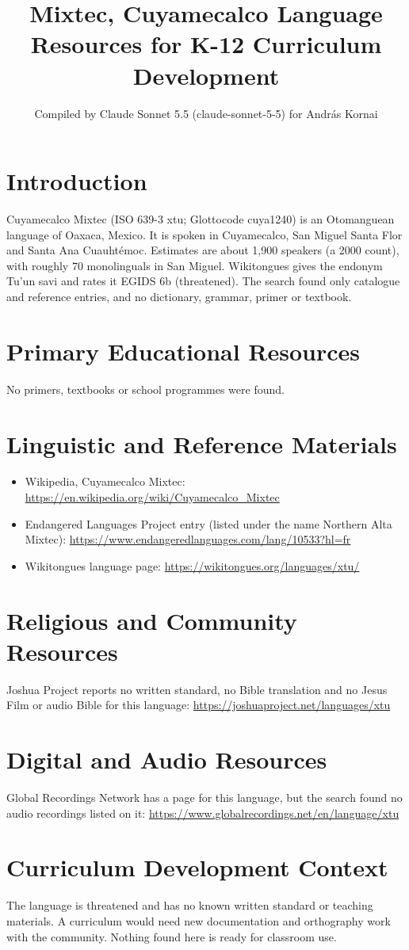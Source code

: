 \documentclass[12pt]{article}
\title{Mixtec, Cuyamecalco Language Resources for K-12 Curriculum Development}
\author{Compiled by Claude Sonnet 5.5 (claude-sonnet-5-5) for Andr\'as Kornai}
\date{}
\begin{document}
\maketitle

\section{Introduction}
Cuyamecalco Mixtec (ISO 639-3 xtu; Glottocode cuya1240) is an Otomanguean language of Oaxaca, Mexico. It is spoken in Cuyamecalco, San Miguel Santa Flor and Santa Ana Cuauhtémoc. Estimates are about 1,900 speakers (a 2000 count), with roughly 70 monolinguals in San Miguel. Wikitongues gives the endonym Tu'un savi and rates it EGIDS 6b (threatened). The search found only catalogue and reference entries, and no dictionary, grammar, primer or textbook.

\section{Primary Educational Resources}
No primers, textbooks or school programmes were found.

\section{Linguistic and Reference Materials}
\begin{itemize}
\item Wikipedia, Cuyamecalco Mixtec: \url{https://en.wikipedia.org/wiki/Cuyamecalco_Mixtec}
\item Endangered Languages Project entry (listed under the name Northern Alta Mixtec): \url{https://www.endangeredlanguages.com/lang/10533?hl=fr}
\item Wikitongues language page: \url{https://wikitongues.org/languages/xtu/}
\end{itemize}

\section{Religious and Community Resources}
Joshua Project reports no written standard, no Bible translation and no Jesus Film or audio Bible for this language: \url{https://joshuaproject.net/languages/xtu}

\section{Digital and Audio Resources}
Global Recordings Network has a page for this language, but the search found no audio recordings listed on it: \url{https://www.globalrecordings.net/en/language/xtu}

\section{Curriculum Development Context}
The language is threatened and has no known written standard or teaching materials. A curriculum would need new documentation and orthography work with the community. Nothing found here is ready for classroom use.
\end{document}
